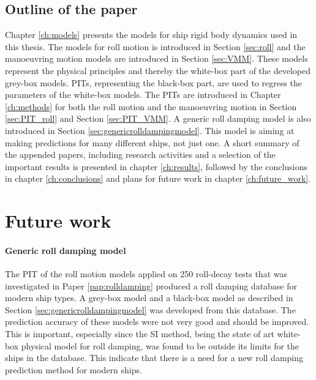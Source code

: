\section{Outline of the paper}
Chapter \ref{ch:models} presents the models for ship rigid body dynamics used in this thesis. The models for roll motion is introduced in Section \ref{sec:roll} and the manoeuvring motion models are introduced in Section \ref{sec:VMM}. These models represent the physical principles and thereby the white-box part of the developed grey-box models.
PITs, representing the black-box part, are used to regress the parameters of the white-box models. The PITs are introduced in Chapter \ref{ch:methods} for both the roll motion and the manoeuvring motion in Section \ref{sec:PIT_roll} and Section \ref{sec:PIT_VMM}. 
A generic roll damping model is also introduced in Section \ref{sec:genericrolldampingmodel}. This model is aiming at making predictions for many different ships, not just one.
A short summary of the appended papers, including research activities and a selection of the important results is presented in chapter \ref{ch:results}, followed by the conclusions in chapter \ref{ch:conclusions} and plans for future work in chapter \ref{ch:future_work}.






\chapter{Future work\label{ch:future_work}}

\subsubsection*{Generic roll damping model}
The PIT of the roll motion models applied on 250 roll-decay tests that was investigated in Paper \ref{pap:rolldamping} produced a roll damping database for modern ship types. A grey-box model and a black-box model as described in Section \ref{sec:genericrolldampingmodel} was developed from this database. The prediction accuracy of these models were not very good and should be improved. This is important, especially since the SI method, being the state of art white-box physical model for roll damping, was found to be outside its limits for the ships in the database. This indicate that there is a need for a new roll damping prediction method for modern ships.  